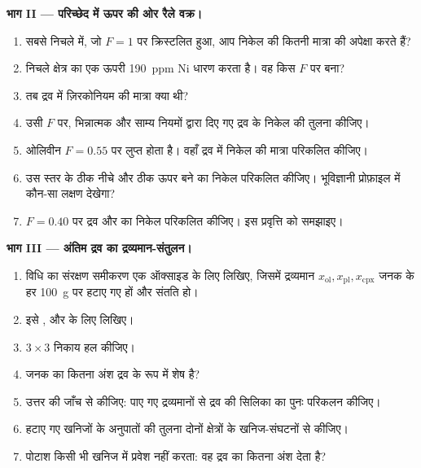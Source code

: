 \begin{problem}
\noindent\textbf{भाग II --- परिच्छेद में ऊपर की ओर रैले वक्र।}
\begin{enumerate}[resume]
\item सबसे निचले  में, जो $F = 1$ पर क्रिस्टलित हुआ, आप निकेल की कितनी मात्रा की
अपेक्षा करते हैं?
\item निचले क्षेत्र का एक ऊपरी  \qty{190}{ppm} Ni धारण करता है। वह किस $F$ पर
बना?
\item तब द्रव में ज़िरकोनियम की मात्रा क्या थी?
\item उसी $F$ पर, भिन्नात्मक और साम्य नियमों द्वारा दिए गए द्रव के निकेल की
तुलना कीजिए।
\item ओलिवीन $F = 0.55$ पर लुप्त होता है। वहाँ द्रव में निकेल की मात्रा
परिकलित कीजिए।
\item उस स्तर के ठीक नीचे और ठीक ऊपर बने  का निकेल परिकलित कीजिए। भूविज्ञानी
प्रोफ़ाइल में कौन-सा लक्षण देखेगा?
\item $F = 0.40$ पर द्रव और  का निकेल परिकलित कीजिए। इस
प्रवृत्ति को समझाइए।
\end{enumerate}

\noindent\textbf{भाग III --- अंतिम द्रव का द्रव्यमान-संतुलन।}
\begin{enumerate}[resume]
\item विधि का संरक्षण समीकरण एक ऑक्साइड के लिए लिखिए, जिसमें द्रव्यमान
$x_{\mathrm{ol}}, x_{\mathrm{pl}}, x_{\mathrm{cpx}}$ जनक के हर \qty{100}{g} पर
हटाए गए हों और  संतति हो।
\item इसे ,  और  के लिए लिखिए।
\item $3 \times 3$ निकाय हल कीजिए।
\item जनक का कितना अंश द्रव के रूप में शेष है?
\item उत्तर की जाँच  से कीजिए: पाए गए द्रव्यमानों से द्रव की सिलिका का
पुनः परिकलन कीजिए।
\item हटाए गए खनिजों के अनुपातों की तुलना दोनों क्षेत्रों के
खनिज-संघटनों से कीजिए।
\item पोटाश किसी भी खनिज में प्रवेश नहीं करता: वह द्रव का कितना अंश देता है?
\end{enumerate}


\end{problem}

